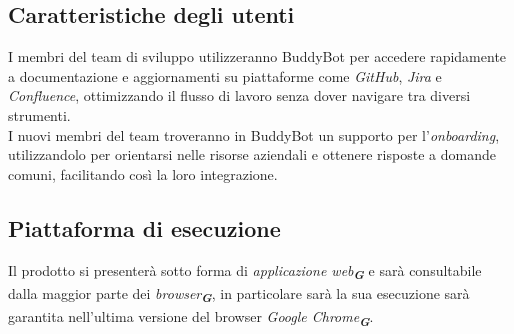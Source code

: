 \subsection{Caratteristiche degli utenti}
I membri del team di sviluppo utilizzeranno BuddyBot per accedere rapidamente a documentazione e aggiornamenti su piattaforme come 
\emph{GitHub}, \emph{Jira} e \emph{Confluence}, ottimizzando il flusso di lavoro senza dover navigare tra diversi strumenti.\\
I nuovi membri del team troveranno in BuddyBot un supporto per l'\emph{onboarding}, utilizzandolo per 
orientarsi nelle risorse aziendali e ottenere risposte a domande comuni, facilitando così la loro integrazione.

\subsection{Piattaforma di esecuzione}
Il prodotto si presenterà sotto forma di \emph{applicazione web}\textsubscript{\textit{\textbf{G}}} e sarà consultabile dalla maggior
parte dei \emph{browser}\textsubscript{\textit{\textbf{G}}}, in particolare sarà la sua esecuzione sarà garantita nell'ultima versione
del browser \emph{Google Chrome}\textsubscript{\textit{\textbf{G}}}.